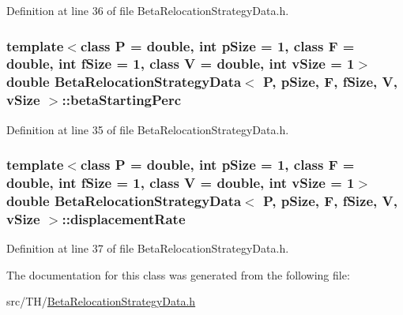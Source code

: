 Definition at line 36 of file Beta\+Relocation\+Strategy\+Data.\+h.

\subsubsection[{\texorpdfstring{beta\+Starting\+Perc}{betaStartingPerc}}]{\setlength{\rightskip}{0pt plus 5cm}template$<$class P = double, int p\+Size = 1, class F = double, int f\+Size = 1, class V = double, int v\+Size = 1$>$ double {\bf Beta\+Relocation\+Strategy\+Data}$<$ P, p\+Size, F, f\+Size, V, v\+Size $>$\+::beta\+Starting\+Perc}\hypertarget{structBetaRelocationStrategyData_a979c9c710b41d2d745ef519b4eff2b9b}{}\label{structBetaRelocationStrategyData_a979c9c710b41d2d745ef519b4eff2b9b}


Definition at line 35 of file Beta\+Relocation\+Strategy\+Data.\+h.

\subsubsection[{\texorpdfstring{displacement\+Rate}{displacementRate}}]{\setlength{\rightskip}{0pt plus 5cm}template$<$class P = double, int p\+Size = 1, class F = double, int f\+Size = 1, class V = double, int v\+Size = 1$>$ double {\bf Beta\+Relocation\+Strategy\+Data}$<$ P, p\+Size, F, f\+Size, V, v\+Size $>$\+::displacement\+Rate}\hypertarget{structBetaRelocationStrategyData_a92704a1adaddfe1d7545fd3f1c921fcd}{}\label{structBetaRelocationStrategyData_a92704a1adaddfe1d7545fd3f1c921fcd}


Definition at line 37 of file Beta\+Relocation\+Strategy\+Data.\+h.



The documentation for this class was generated from the following file\+:\begin{DoxyCompactItemize}
\item 
src/\+T\+H/\hyperlink{BetaRelocationStrategyData_8h}{Beta\+Relocation\+Strategy\+Data.\+h}\end{DoxyCompactItemize}
